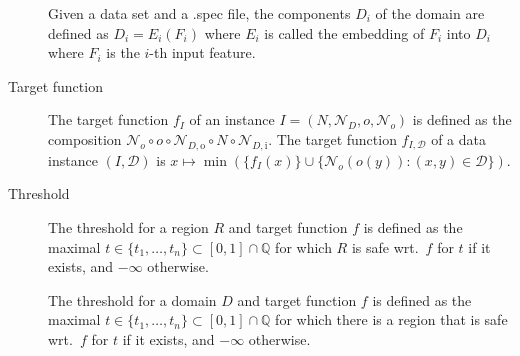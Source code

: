 \documentclass[a4paper,parskip=half]{article} %
\begin{document}
\begin{description}
	Given a data set and a .spec file, the components $D_i$ of the domain
	are defined as $D_i=E_i(F_i)$ where
	$E_i$ is called the embedding of $F_i$ into $D_i$ where $F_i$ is the
	$i$-th input feature.
\item[Target function]
	The target function $f_I$ of an instance
	$I=(N,\mathcal N_D,o,\mathcal N_o)$ is defined as the composition
	$\mathcal N_o\circ o\circ\mathcal N_{D,\mathrm o}\circ
	N\circ\mathcal N_{D,\mathrm i}$.
	The target function $f_{I,\mathcal D}$ of a data instance
	$(I,\mathcal D)$ is
	$x\mapsto\min(\{f_I(x)\}\cup\{\mathcal N_o(o(y)):(x,y)\in\mathcal D\})$.
\item[Threshold]
	The threshold for a region $R$ and target function $f$ is defined
	as the maximal $t\in\{t_1,\ldots,t_n\}\subset[0,1]\cap\mathbb Q$ for
	which $R$ is safe wrt.\ $f$ for $t$ if it exists, and $-\infty$ otherwise.

	The threshold for a domain $D$ and target function $f$ is defined
	as the maximal $t\in\{t_1,\ldots,t_n\}\subset[0,1]\cap\mathbb Q$ for
	which there is a region that is safe wrt.\ $f$ for $t$ if it exists, and
	$-\infty$ otherwise.
\end{description}
\end{document}
